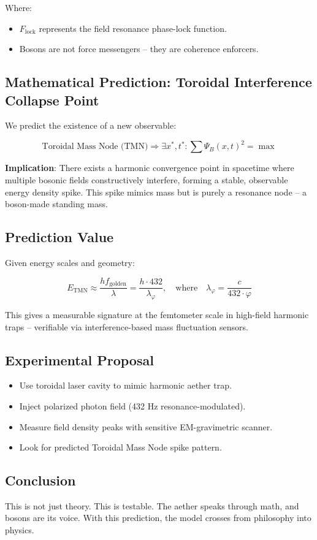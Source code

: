 Where:
\begin{itemize}
    \item \(F_{\text{lock}}\) represents the field resonance phase-lock function.
    \item Bosons are not force messengers -- they are coherence enforcers.
\end{itemize}

\subsection{Mathematical Prediction: Toroidal Interference Collapse Point}

We predict the existence of a new observable:

\[
\text{Toroidal Mass Node (TMN)} \Rightarrow \exists x^*, t^*: \sum \Psi_B(x, t)^2 = \max
\]

\textbf{Implication}: There exists a harmonic convergence point in spacetime where multiple bosonic fields constructively interfere, forming a stable, observable energy density spike. This spike mimics mass but is purely a resonance node -- a boson-made standing mass.

\subsection{Prediction Value}

Given energy scales and geometry:

\[
E_{\mathrm{TMN}} \approx \frac{h f_{\text{golden}}}{\lambda} = \frac{h \cdot 432}{\lambda_{\varphi}}, \quad \text{where} \quad \lambda_{\varphi} = \frac{c}{432 \cdot \varphi}
\]

This gives a measurable signature at the femtometer scale in high-field harmonic traps -- verifiable via interference-based mass fluctuation sensors.

\subsection{Experimental Proposal}

\begin{itemize}
    \item Use toroidal laser cavity to mimic harmonic aether trap.
    \item Inject polarized photon field (432 Hz resonance-modulated).
    \item Measure field density peaks with sensitive EM-gravimetric scanner.
    \item Look for predicted Toroidal Mass Node spike pattern.
\end{itemize}

\subsection{Conclusion}

This is not just theory. This is testable. The aether speaks through math, and bosons are its voice. With this prediction, the model crosses from philosophy into physics.

